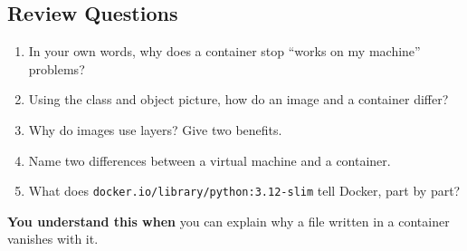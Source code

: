 \subsection*{Review Questions}\label{02-containers-shipping-the-whole-kitchen:review-questions}

\begin{enumerate}
\def\labelenumi{\arabic{enumi}.}
\tightlist
\item
  In your own words, why does a container stop ``works on my machine'' problems?
\item
  Using the class and object picture, how do an image and a container differ?
\item
  Why do images use layers? Give two benefits.
\item
  Name two differences between a virtual machine and a container.
\item
  What does \texttt{docker.}\allowbreak{}\texttt{io/}\allowbreak{}\texttt{library/}\allowbreak{}\texttt{python:}\allowbreak{}\texttt{3.}\allowbreak{}\texttt{12-}\allowbreak{}\texttt{slim} tell Docker, part by part?
\end{enumerate}

\begin{understandbox}

\textbf{You understand this when} you can explain why a file written in a container vanishes with it.

\end{understandbox}
